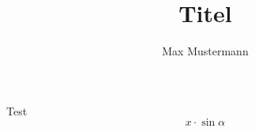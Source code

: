 \documentclass{beamer}
\title{Titel}
\author{Max Mustermann}
\begin{document}
\begin{frame}[plain]
  \titlepage
\end{frame}

\begin{frame}
  Test
  \[x\cdot\sin\alpha\]
\end{frame}
\end{document}
